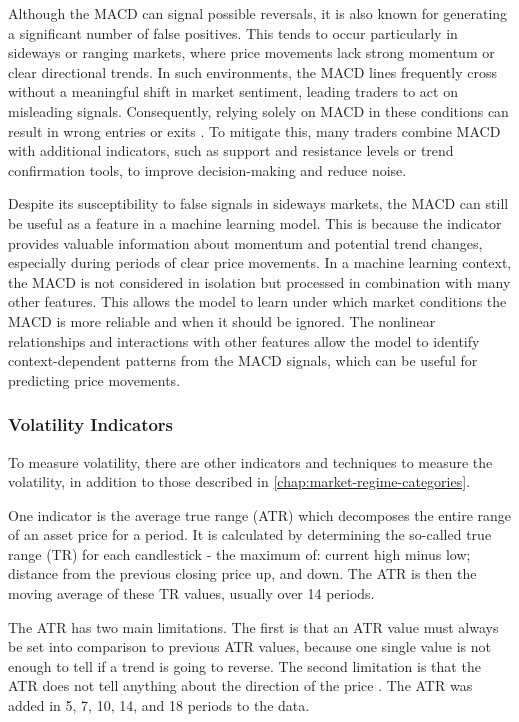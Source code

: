 Although the MACD can signal possible reversals, it is also known for generating a significant number of false positives.
This tends to occur particularly in sideways or ranging markets, where price movements lack strong momentum or clear directional trends.
In such environments, the MACD lines frequently cross without a meaningful shift in market sentiment, leading traders to act on misleading signals.
Consequently, relying solely on MACD in these conditions can result in wrong entries or exits \cite{investopia-macd}.
To mitigate this, many traders combine MACD with additional indicators, such as support and resistance levels or trend confirmation tools, to improve decision-making and reduce noise.

Despite its susceptibility to false signals in sideways markets, the MACD can still be useful as a feature in a machine learning model.
This is because the indicator provides valuable information about momentum and potential trend changes, especially during periods of clear price movements.
In a machine learning context, the MACD is not considered in isolation but processed in combination with many other features.
This allows the model to learn under which market conditions the MACD is more reliable and when it should be ignored.
The nonlinear relationships and interactions with other features allow the model to identify context-dependent patterns from the MACD signals, which can be useful for predicting price movements.


\subsubsection{Volatility Indicators}

To measure volatility, there are other indicators and techniques to measure the volatility, in addition to those described in \autoref{chap:market-regime-categories}.

One indicator is the average true range (ATR) which decomposes the entire range of an asset price for a period.
It is calculated by determining the so-called true range (TR) for each candlestick - the maximum of: current high minus low; distance from the previous closing price up, and down.
The ATR is then the moving average of these TR values, usually over 14 periods.

The ATR has two main limitations.
The first is that an ATR value must always be set into comparison to previous ATR values, because one single value is not enough to tell if a trend is going to reverse.
The second limitation is that the ATR does not tell anything about the direction of the price \cite{investopia-atr}.
The ATR was added in 5, 7, 10, 14, and 18 periods to the data.

